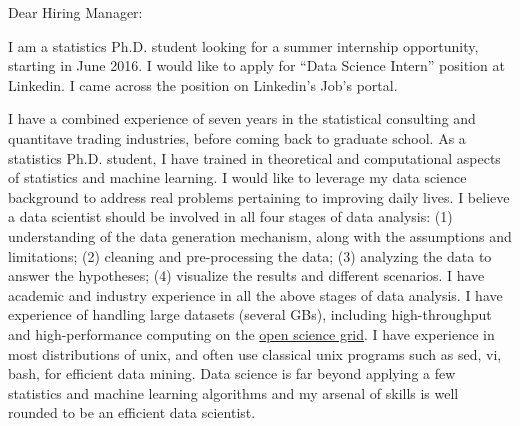 \documentclass{letter} %
\begin{document}
\begin{letter}
\opening{Dear Hiring Manager:} 
 
\noindent %
I am a statistics Ph.D. student looking for a summer internship opportunity, starting in June 2016. I would like to apply for ``Data Science Intern'' position at Linkedin. I came across the position on Linkedin's Job's portal.
 
\noindent %
I have a combined experience of seven years in the statistical consulting and quantitave trading industries, before coming back to graduate school. As a statistics Ph.D. student, I have trained in theoretical and computational aspects of statistics and machine learning. I would like to leverage my data science background to address real problems pertaining to improving daily lives. I believe a data scientist should be involved in all four stages of data analysis: (1) understanding of the data generation mechanism, along with the assumptions and limitations; (2) cleaning and pre-processing the data; (3) analyzing the data to answer the hypotheses; (4) visualize the results and different scenarios. I have academic and industry experience in all the above stages of data analysis. I have experience of handling large datasets (several GBs), including high-throughput and high-performance computing on the \href{http://www.opensciencegrid.org/}{open science grid}. I have experience in most distributions of unix, and often use classical unix programs such as sed, vi, bash, for efficient data mining. Data science is far beyond applying a few statistics and machine learning algorithms and my arsenal of skills is well rounded to be an efficient data scientist. 


\end{letter}
\end{document}
